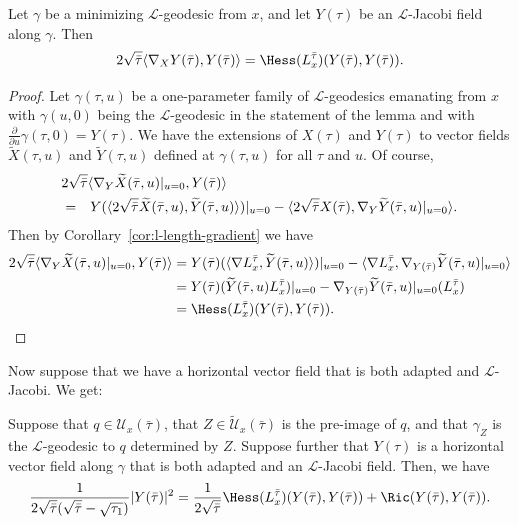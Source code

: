 \begin{lemma}\label{lem:l-length-hessian-jacobi-formula}
\label{Jacobi}
Let  $\gamma$ be a minimizing ${\mathcal L}$-geodesic from $x$, and
let $Y(\tau)$ be an ${\mathcal L}$-Jacobi field along $\gamma$. Then
$$2\sqrt{\bar\tau}\langle\nabla_XY(\bar\tau),Y(\bar\tau)\rangle = \Hess(L_x^{\bar\tau})(Y(\bar\tau),
Y(\bar\tau)).$$
\end{lemma}

\begin{proof}
\sketch
{}
Let $\gamma(\tau,u)$ be a one-parameter family of ${\mathcal
L}$-geodesics emanating from $x$ with $\gamma(u,0)$ being the
${\mathcal L}$-geodesic in the statement of the lemma  and with
$\frac{\partial}{\partial u}\gamma(\tau,0)=Y(\tau)$. We have the
extensions of $X(\tau)$ and $Y(\tau)$ to vector fields $\widetilde
X(\tau,u)$ and $\widetilde Y(\tau,u)$ defined at $\gamma(\tau,u)$
for all $\tau$ and $u$. Of course,
\begin{eqnarray*}
\lefteqn{2\sqrt{\bar\tau}\langle \nabla_Y\widetilde
X(\bar\tau,u)|_{u=0},Y(\bar\tau)\rangle  } \\
& = & Y(\langle 2\sqrt{\bar\tau}\widetilde X(\bar\tau,u),\widetilde
Y(\bar\tau,u)\rangle)|_{u=0}-\langle
2\sqrt{\bar\tau}X(\bar\tau),\nabla_Y\widetilde
Y(\bar\tau,u)|_{u=0}\rangle.\end{eqnarray*} Then by
Corollary~\ref{cor:l-length-gradient} we have
\begin{align*}
2\sqrt{\bar\tau}\langle \nabla_Y\widetilde
X(\bar\tau,u)|_{u=0},Y(\bar\tau)\rangle & = Y(\bar\tau)(\langle
\nabla L_x^{\bar\tau},\widetilde
Y(\bar\tau,u)\rangle)|_{u=0}-\langle \nabla
L_x^{\bar\tau},\nabla_{Y(\bar\tau)}\widetilde
Y(\bar\tau,u)|_{u=0}\rangle
\\
& = Y(\bar\tau)(\widetilde Y(\bar\tau,u)
L_x^{\bar\tau})|_{u=0}-\nabla_{Y(\bar\tau)}\widetilde
Y(\bar\tau,u)|_{u=0}(L_x^{\bar\tau}) \\ & =  \Hess(L_x^{\bar\tau})(Y(\bar\tau),Y(\bar\tau)).
\end{align*}
\end{proof}


Now suppose that we have a horizontal vector field that is both
adapted and ${\mathcal L}$-Jacobi. We get:

\begin{lemma}\label{lem:adapted-jacobi-hessian-relation}
\label{adapjab}
Suppose that $q\in {\mathcal U}_x(\bar\tau)$, that $Z\in \widetilde
{\mathcal U}_x(\bar\tau)$ is the pre-image of $q$, and that
$\gamma_Z$ is the  ${\mathcal L}$-geodesic to $q$ determined by $Z$.
Suppose further that $Y(\tau)$ is a horizontal vector field along
$\gamma$ that is both adapted and an ${\mathcal L}$-Jacobi field.
Then,  we have
$$\frac{1}{2\sqrt{\bar\tau}(\sqrt{\bar\tau}-\sqrt{\tau_1})}|Y(\bar\tau)|^2
=\frac{1}{2\sqrt{\bar\tau}}\Hess(L_x^{\bar\tau})(Y(\bar\tau),Y(\bar\tau))+\Ric(Y(\bar\tau),Y(\bar\tau)).$$
\end{lemma}

